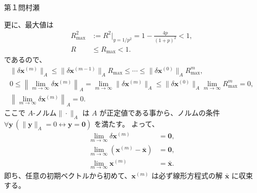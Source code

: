 \begin{answer}{第１問}{村瀬}
\begin{enumerate}
  更に、最大値は
  \begin{align*}
    R_{\max}^2
      &:= R^2|_{y=1/p^2}
      = 1-\frac{4p}{(1+p)^2} < 1,\\
    R &\le R_{\max} <1.
  \end{align*}
  であるので、
  \begin{gather*}
    \|\delta\bm{x}^{(m)}\|_A
      \le \|\delta\bm{x}^{(m-1)}\|_A R_{\max} \le \cdots
      \le \|\delta\bm{x}^{(0)}\|_A R_{\max}^m,\\
    0 \le \left\| \lim_{m\to\infty} \delta\bm{x}^{(m)}\right\|_A
      = \lim_{m\to\infty} \|\delta\bm{x}^{(m)}\|_A
      \le \|\delta\bm{x}^{(0)}\|_A \lim_{m\to\infty} R_{\max}^m  = 0,\\
    \left\| \lim_{m\to\infty} \delta\bm{x}^{(m)}\right\|_A = 0.
  \end{gather*}
  ここで $A$-ノルム$\|\cdot\|_A$ は $A$ が正定値である事から、ノルムの条件
  $\forall\bm{y}\,(\|\bm{y}\|_A=0\leftrightarrow\bm{y}=\bm{0})$ を満たす。
  よって、
  \begin{align*}
    \lim_{m\to\infty} \delta\bm{x}^{(m)} &= \bm{0},\\
    \lim_{m\to\infty}(\bm{x}^{(m)} - \bar{\bm{x}}) &= \bm{0},\\
    \lim_{m\to\infty}\bm{x}^{(m)} &= \bar{\bm{x}}.
  \end{align*}
  即ち、任意の初期ベクトルから初めて、$\bm{x}^{(m)}$ は必ず線形方程式の解 $\bar{\bm{x}}$ に収束する。
\end{enumerate}
\end{answer}


